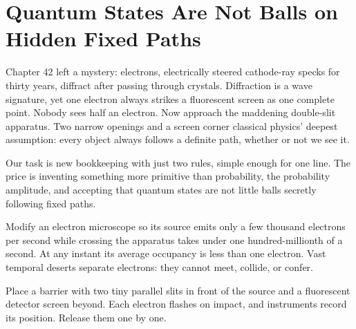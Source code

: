 \chapter[Quantum States and Hidden Paths]{Quantum States Are Not Balls on Hidden Fixed Paths}

Chapter 42 left a mystery: electrons, electrically steered cathode-ray specks for thirty years, diffract after passing through crystals. Diffraction is a wave signature, yet one electron always strikes a fluorescent screen as one complete point. Nobody sees half an electron. Now approach the maddening double-slit apparatus. Two narrow openings and a screen corner classical physics' deepest assumption: every object always follows a definite path, whether or not we see it.

Our task is new bookkeeping with just two rules, simple enough for one line. The price is inventing something more primitive than probability, the probability amplitude, and accepting that quantum states are not little balls secretly following fixed paths.


Modify an electron microscope so its source emits only a few thousand electrons per second while crossing the apparatus takes under one hundred-millionth of a second. At any instant its average occupancy is less than one electron. Vast temporal deserts separate electrons: they cannot meet, collide, or confer.

Place a barrier with two tiny parallel slits in front of the source and a fluorescent detector screen beyond. Each electron flashes on impact, and instruments record its position. Release them one by one.


